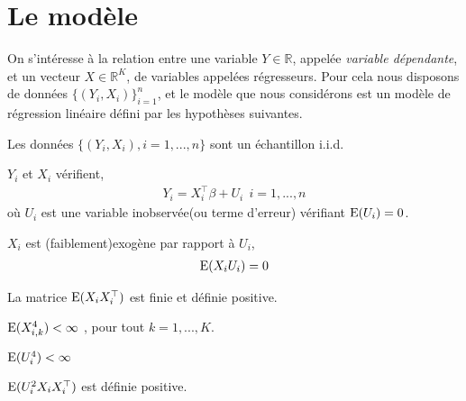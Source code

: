\newpage

\tableofcontents

\newpage

\section{Le modèle}
On s'intéresse à la relation entre une variable $Y\in \mathbb{R}$, appelée \emph{variable dépendante}, et un vecteur $X\in \mathbb{R}^K$, de variables appelées  régresseurs. Pour cela nous disposons de données $\{(Y_i, X_i)\}_{i=1}^n$, et le modèle que nous considérons est un modèle de régression linéaire défini par les hypothèses suivantes.
\begin{condition}
Les données  $\{(Y_i, X_i), i = 1,...,n\}$ sont un échantillon i.i.d.
\label{cond1}
\end{condition}
\begin{condition} $Y_i$  et $X_i$ vérifient,
\begin{align*} 
Y_i= X_i^\top\beta + U_i \ \ i = 1,...,n
\end{align*}
où $U_i$ est une variable inobservée(ou terme d'erreur) vérifiant $\operatorname{E}(U_i) = 0$.
\label{cond2} 
\end{condition}
\begin{condition}$X_i$ est (faiblement)exogène par rapport à $U_i$,
\begin{align*}
\operatorname{E}(X_iU_i) = 0
\end{align*}
\label{cond3} 
\end{condition}
\begin{condition} 
La matrice $\operatorname{E}(X_iX_i^\top)$ est finie et définie positive.
\label{cond4}
\end{condition}
\begin{condition}
$\operatorname{E}(X_{i,k}^4) < \infty$ , pour tout $k=1,...,K$.
\label{cond5}
\end{condition}
\begin{condition}
$\operatorname{E}(U_i^4) < \infty$
\label{cond6}
\end{condition}
\begin{condition}
$\operatorname{E}(U_i^2X_iX_i^\top)$ est définie positive.
\label{cond7}
\end{condition}

